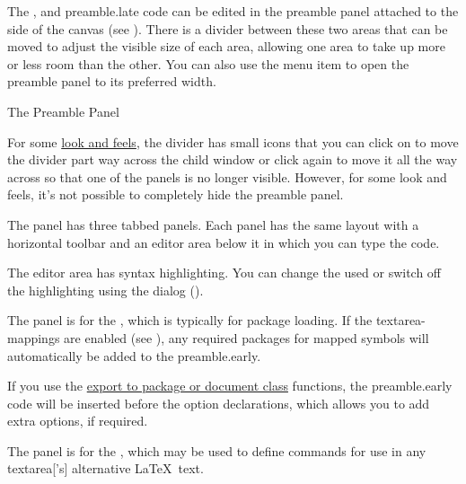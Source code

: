 
The ,  and
\gls{preamble.late} code can be edited in the
\gls{preamble} panel attached to the side of the
\gls{canvas} (see ). There is a
divider between these two areas that can be moved to adjust the
visible size of each area, allowing one area to take up more or less
room than the other. You can also use the 
menu item to open the preamble panel to its preferred width.

{}
{The Preamble Panel}

For some \hyperref[sec:lookandfeel]{look and feels}, the
divider has small icons that you can click on to move the divider
part way across the child window or click again to move it all the
way across so that one of the panels is no longer visible. However,
for some look and feels, it's not possible to completely hide the
preamble panel.


The  panel has three tabbed panels.
Each panel has the same layout with a horizontal toolbar and an
editor area below it in which you can type the code. 

The editor area has syntax highlighting. You can change the
 used or switch off the highlighting using the
 dialog ().


The  panel is for the 
, which is typically for package
loading. If the \glspl{textarea-mapping} are enabled (see
), any
required packages for mapped symbols will automatically be
added to the \gls{preamble.early}.

If you use the \hyperref[sec:exportsty]{export to package or document
class} functions, the \gls{preamble.early} code will be
inserted before the option declarations, which allows you to add
extra options, if required.


The  panel is for the
, which may be used to define
commands for use in any \gls{textarea}['s] alternative \LaTeX\ text.

